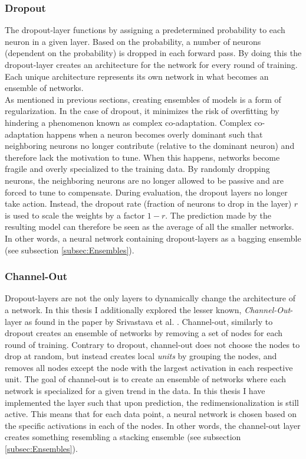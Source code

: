 \subsubsection*{Dropout}\label{subsubsec:Dropout}
The dropout-layer functions by assigning a predetermined probability to each neuron in a given layer. Based on the 
probability, a number of neurons (dependent on the probability) is dropped in each forward pass. By doing this the 
dropout-layer creates an architecture for the network for every round of training. Each unique architecture represents 
its own network in what becomes an ensemble of networks. 
\\
As mentioned in previous sections, creating ensembles of models is a form of regularization. In the case of 
dropout, it minimizes the risk of overfitting by hindering a phenomenon known as complex co-adaptation. Complex
co-adaptation happens when a neuron becomes overly dominant such that neighboring neurons no longer contribute (relative
to the dominant neuron) and therefore lack the motivation to tune. When this happens, networks become fragile and overly 
specialized to the training data. By randomly dropping neurons, the neighboring neurons are no longer allowed to be passive 
and are forced to tune to compensate. During evaluation, the dropout layers no longer take action. Instead, the dropout rate 
(fraction of neurons to drop in the layer) $r$ is used to scale the weights by a factor $1-r$. The prediction made by the resulting 
model can therefore be seen as the average of all the smaller networks. In other words, a neural network containing dropout-layers 
as a bagging ensemble (see subsection \ref{subsec:Ensembles}). 

\subsubsection*{Channel-Out}\label{subsubsec:Channel-Out}
Dropout-layers are not the only layers to dynamically change the architecture of a network. In this thesis I additionally 
explored the lesser known, \emph{Channel-Out}-layer as found in the paper by Srivastava et al. \cite{wang_maxout_2013}. 
Channel-out, similarly to dropout creates an ensemble of networks by removing a set 
of nodes for each round of training. Contrary to dropout, channel-out does not choose the nodes to drop at random,
but instead creates local \emph{units} by grouping the nodes, and removes all nodes except the node with the largest
activation in each respective unit. The goal of channel-out is to create an ensemble of networks where each network is specialized for a given 
trend in the data. In this thesis I have implemented the layer such that upon prediction, the redimensionalization 
is still active. This means that for each data point, a neural network is chosen based on the specific activations in 
each of the nodes. In other words, the channel-out layer creates something resembling a stacking ensemble (see subsection 
\ref{subsec:Ensembles}). 
